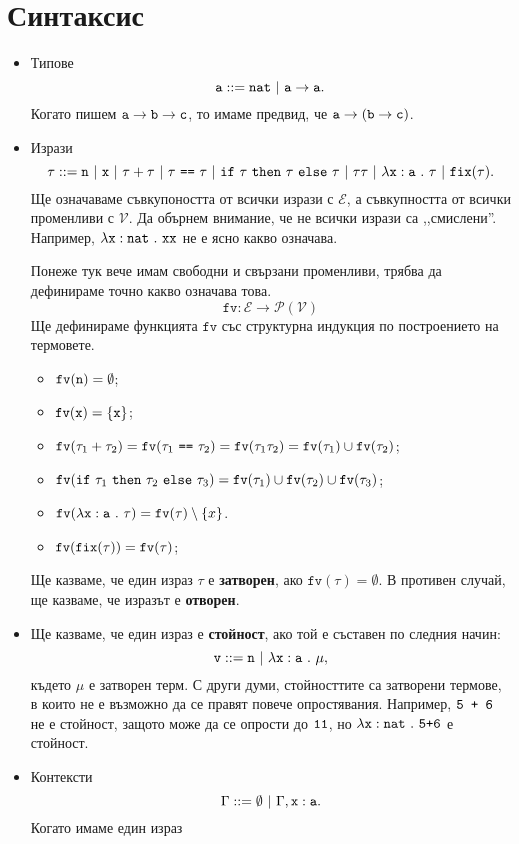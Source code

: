 \section{Синтаксис}

\newcommand{\rename}[2]{\{\vv{#1}/\vv{#2}\}}

\newcommand{\fv}{\texttt{fv}}

\begin{itemize}
\item
  Типове
  \[\vv{a} ::= \vv{nat}\ |\ \vv{a} \to \vv{a}.\]
  Когато пишем 
  $\texttt{a} \to \texttt{b} \to \texttt{c}$, то имаме предвид, че
  $\texttt{a} \to (\texttt{b} \to \texttt{c})$.
\item
  Изрази
  \[\tau ::= \vv{n}\ |\ \vv{x}\ |\ \tau + \tau\ |\ \tau\ \vv{==}\ \tau\ |\ \ifelse{\tau}{\tau}{\tau}\ |\ \tau\tau\ |\ \lamb{x}{a}{\tau}\ |\ \fix(\tau).\]
  Ще означаваме съвкупоността от всички изрази с $\mathcal{E}$, а съвкупността от всички променливи с $\mathcal{V}$.
  Да обърнем внимание, че не всички изрази са ,,смислени''. Например,
  $\lambda\texttt{x}:\texttt{nat}\ .\ {\texttt{xx}}$ не е ясно какво означава.
  
  Понеже тук вече имам свободни и свързани променливи, трябва да дефинираме точно какво означава това.
  \[\fv:\mathcal{E} \to \mathcal{P}(\mathcal{V})\]
  Ще дефинираме функцията $\texttt{fv}$ със структурна индукция по построението на термовете.
  
  \begin{itemize}
  \item
    $\fv(\vv{n}) = \emptyset$;
  \item
    $\fv(\vv{x}) = \{\vv{x}\}$;
  \item
    $\fv(\tau_1 + \tau_2) = \fv(\tau_1\ \vv{==}\ \tau_2) = \fv(\tau_1\tau_2) = \fv(\tau_1) \cup \fv(\tau_2)$;
  \item
    $\fv(\ifelse{\tau_1}{\tau_2}{\tau_3}) = \fv(\tau_1) \cup \fv(\tau_2) \cup \fv(\tau_3)$;
  \item
    $\fv(\lamb{x}{a}{\tau}) = \fv(\tau) \setminus \{x\}$.
  \item
    $\fv(\fix(\tau)) = \fv(\tau)$;
  \end{itemize}
  
  Ще казваме, че един израз $\tau$ е {\bf затворен}, ако $\fv(\tau) = \emptyset$.
  В противен случай, ще казваме, че изразът е {\bf отворен}.
\item
  Ще казваме, че един израз е {\bf стойност}, ако той е съставен по следния начин:
  \[\vv{v} ::= \vv{n}\ |\ \lamb{x}{a}{\mu},\]
  където $\mu$ е затворен терм.
  С други думи, стойносттите са затворени термове, в които не е възможно да се правят повече опростявания.
  Например, $\texttt{5 + 6}$ не е стойност, защото може да се опрости до $\texttt{11}$,
  но $\lambda\texttt{x}:\texttt{nat}\ .\ {\texttt{5+6}}$ е стойност.
\item
  Контексти
  \[\Gamma ::= \emptyset\ |\ \Gamma,\type{x}{a}.\]
  Когато имаме един израз 
\end{itemize}

